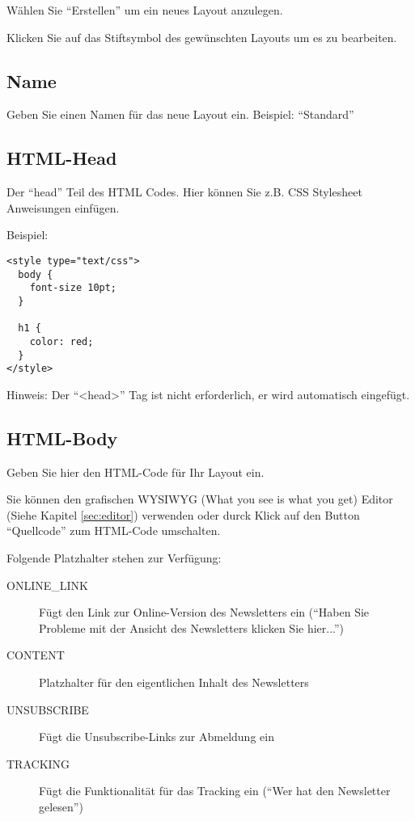 \documentclass[article, a4paper, oneside, 11pt]{memoir}
\begin{document}
Wählen Sie "`Erstellen"' um ein neues Layout anzulegen.

Klicken Sie auf das Stiftsymbol des gewünschten Layouts um es zu bearbeiten.

\subsection{Name}

Geben Sie einen Namen für das neue Layout ein. Beispiel: "`Standard"'

\subsection{HTML-Head}

Der "`head"' Teil des HTML Codes. Hier können Sie z.B. CSS Stylesheet Anweisungen einfügen.

Beispiel:

\begin{lstlisting}
<style type="text/css">
  body {
    font-size 10pt; 
  }
  
  h1 { 
    color: red;
  } 
</style>
\end{lstlisting}

Hinweis: Der "`<head>"' Tag ist nicht erforderlich, er wird automatisch eingefügt.

\subsection{HTML-Body}

Geben Sie hier den HTML-Code für Ihr Layout ein.

Sie können den grafischen WYSIWYG (What you see is what you get) Editor (Siehe Kapitel \vref{sec:editor}) verwenden oder durck Klick auf den Button "`Quellcode"' zum HTML-Code umschalten.

Folgende Platzhalter stehen zur Verfügung:

\begin{description}
 \item[\lbrack ONLINE\_LINK\rbrack] Fügt den Link zur Online-Version des Newsletters ein ("`Haben Sie Probleme mit der Ansicht des Newsletters klicken Sie hier..."')
 \item[\lbrack CONTENT\rbrack] Platzhalter für den eigentlichen Inhalt des Newsletters
 \item[\lbrack UNSUBSCRIBE\rbrack] Fügt die Unsubscribe-Links zur Abmeldung ein
 \item[\lbrack TRACKING\rbrack] Fügt die Funktionalität für das Tracking ein ("`Wer hat den Newsletter gelesen"')
\end{description}
\end{document}
